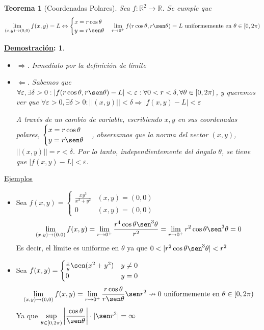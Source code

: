 \documentclass[10pt,a4paper,openright]{book}
\theoremstyle{break}
\newtheorem*{theo}{Teorema}
\newtheorem*{demo}{\underline{Demostración}:}
\begin{document}
\begin{theo}[Coordenadas Polares]
Sea $f: \mathbb{R}^2 \to \mathbb{R}$. Se cumple que 
$$\lim_{(x,y) \to (0,0)} f(x,y) = L \Leftrightarrow \begin{cases}x=r\cos\theta \\ y=r \sen\theta  \end{cases} \lim_{r \to 0^+} f(r \cos\theta,r \sen\theta) = L \mbox{ uniformemente en } \theta \in [0, 2\pi)$$
\end{theo}

\begin{demo}
\begin{itemize}
\item $\Rightarrow$. Inmediato por la definición de límite
\item $\Leftarrow$. Sabemos que $\forall \varepsilon, \exists \delta > 0 : |f(r \cos\theta,r \sen\theta) - L| < \varepsilon : \forall 0 < r < \delta, \forall \theta \in [0,2\pi)$, y queremos ver que $\forall \varepsilon > 0, \exists \delta > 0 : ||(x,y)|| < \delta \Rightarrow |f(x,y) - L| < \varepsilon$

A través de un cambio de variable, escribiendo $x,y$ en sus coordenadas polares, $\begin{cases}x=r\cos\theta \\ y=r \sen\theta  \end{cases}$, observamos que la norma del vector $(x,y)$, $||(x,y)|| = r < \delta$. Por lo tanto, independientemente del ángulo $\theta$, se tiene que $|f(x,y) - L| < \varepsilon$.

\end{itemize}
\end{demo}

\underline{Ejemplos}
\begin{itemize}
\item Sea $f(x,y)= \begin{cases} \frac{xy^3}{x^2  + y^2} & (x,y) = (0,0) \\ 0 & (x,y) = (0,0) \end{cases}$
$$\lim_{(x,y) \to (0,0)} f(x,y) = \lim_{r \to 0^+} \frac{r^4 \cos\theta \sen^3 \theta}{r^2} = \lim_{r \to 0^+} r^2 \cos\theta \sen^3 \theta = 0$$
Es decir, el límite es uniforme en $\theta$ ya que $0 < | r^2 \cos\theta \sen^3 \theta | < r^2$
\item Sea $f(x,y) = \begin{cases} \frac{x}{y} \sen (x^2 + y^2) & y \neq 0 \\ 0 & y = 0 \end{cases}$
$$\lim_{(x,y) \to (0,0)} f(x,y) = \lim_{r \to 0^+} \frac{r \cos\theta}{r \sen\theta} \sen r^2 \nrightarrow 0 \mbox{ uniformemente en } \theta \in [0,2\pi)$$
Ya que $ \displaystyle \sup_{ \theta \in [0,2\pi)} \left|\frac{\cos\theta}{\sen\theta}\right| \cdot |\sen r^2| = \infty$
\end{itemize}
\end{document}
